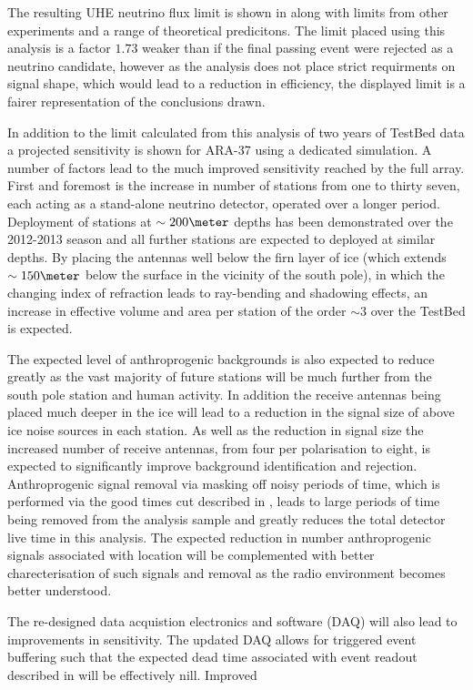 The resulting UHE neutrino flux limit is shown in  along with limits from other experiments and a range of theoretical predicitons. The limit placed using this analysis is a factor $1.73$ weaker than if the final passing event were rejected as a neutrino candidate, however as the analysis does not place strict requirments on signal shape, which would lead to a reduction in efficiency, the displayed limit is a fairer representation of the conclusions drawn.

In addition to the limit calculated from this analysis of two years of TestBed data a projected sensitivity is shown for ARA-37 using a dedicated simulation. A number of factors lead to the much improved sensitivity reached by the full array. First and foremost is the increase in number of stations from one to thirty seven, each acting as a stand-alone neutrino detector, operated over a longer period. Deployment of stations at $\sim 200 \meter$ depths has been demonstrated over the 2012-2013 season and all further stations are expected to deployed at similar depths. By placing the antennas well below the firn layer of ice (which extends $\sim 150 \meter$ below the surface in the vicinity of the south pole), in which the changing index of refraction leads to ray-bending and shadowing effects, an increase in effective volume and area per station of the order $\sim 3$ over the TestBed is expected.

The expected level of anthroprogenic backgrounds is also expected to reduce greatly as the vast majority of future stations will be much further from the south pole station and human activity. In addition the receive antennas being placed much deeper in the ice will lead to a reduction in the signal size of above ice noise sources in each station. As well as the reduction in signal size the increased number of receive antennas, from four per polarisation to eight, is expected to significantly improve background identification and rejection. Anthroprogenic signal removal via masking off noisy periods of time, which is performed via the good times cut described in , leads to large periods of time being removed from the analysis sample and greatly reduces the total detector live time in this analysis. The expected reduction in number anthroprogenic signals associated with location will be complemented with better charecterisation of such signals and removal as the radio environment becomes better understood.

The re-designed data acquistion electronics and software (DAQ) will also lead to improvements in sensitivity. The updated DAQ allows for triggered event buffering such that the expected dead time associated with event readout described in  will be effectively nill. Improved 







